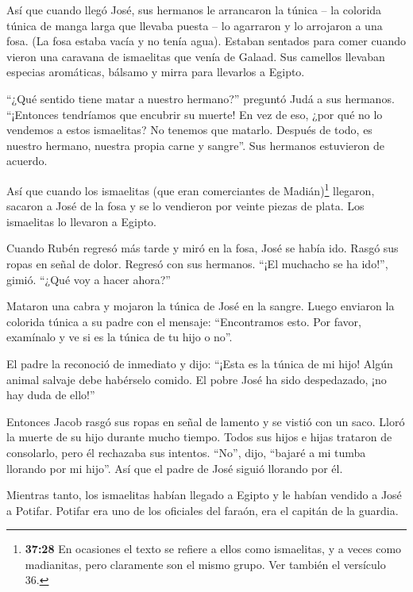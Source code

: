  Así que cuando llegó José, sus hermanos le arrancaron la
túnica -- la colorida túnica de manga larga que llevaba puesta --
 lo agarraron y lo arrojaron a una fosa. (La fosa estaba
vacía y no tenía agua).  Estaban sentados para comer cuando
vieron una caravana de ismaelitas que venía de Galaad. Sus camellos
llevaban especias aromáticas, bálsamo y mirra para llevarlos a Egipto.

 ``¿Qué sentido tiene matar a nuestro hermano?'' preguntó
Judá a sus hermanos. ``¡Entonces tendríamos que encubrir su muerte!
 En vez de eso, ¿por qué no lo vendemos a estos ismaelitas?
No tenemos que matarlo. Después de todo, es nuestro hermano, nuestra
propia carne y sangre''. Sus hermanos estuvieron de acuerdo.

 Así que cuando los ismaelitas (que eran comerciantes de
Madián)\footnote{\textbf{37:28} En ocasiones el texto se refiere a ellos
  como ismaelitas, y a veces como madianitas, pero claramente son el
  mismo grupo. Ver también el versículo 36.} llegaron, sacaron a José de
la fosa y se lo vendieron por veinte piezas de plata. Los ismaelitas lo
llevaron a Egipto.

 Cuando Rubén regresó más tarde y miró en la fosa, José se
había ido. Rasgó sus ropas en señal de dolor.  Regresó con
sus hermanos. ``¡El muchacho se ha ido!'', gimió. ``¿Qué voy a hacer
ahora?''

 Mataron una cabra y mojaron la túnica de José en la
sangre.  Luego enviaron la colorida túnica a su padre con
el mensaje: ``Encontramos esto. Por favor, examínalo y ve si es la
túnica de tu hijo o no''.

 El padre la reconoció de inmediato y dijo: ``¡Esta es la
túnica de mi hijo! Algún animal salvaje debe habérselo comido. El pobre
José ha sido despedazado, ¡no hay duda de ello!''

 Entonces Jacob rasgó sus ropas en señal de lamento y se
vistió con un saco. Lloró la muerte de su hijo durante mucho tiempo.
 Todos sus hijos e hijas trataron de consolarlo, pero él
rechazaba sus intentos. ``No'', dijo, ``bajaré a mi tumba llorando por
mi hijo''. Así que el padre de José siguió llorando por él.

 Mientras tanto, los ismaelitas habían llegado a Egipto y
le habían vendido a José a Potifar. Potifar era uno de los oficiales del
faraón, era el capitán de la guardia.

